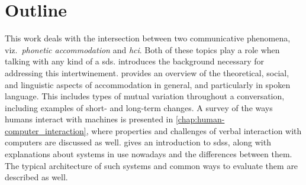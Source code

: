 \section*{Outline}
%
This work deals with the intersection between two communicative phenomena, viz.\ \emph{phonetic accommodation} and \emph{\acl{hci}}.
Both of these topics play a role when talking with any kind of a \acl{sds}.
 introduces the background necessary for addressing this intertwinement.
 provides an overview of the theoretical, social, and linguistic aspects of accommodation in general, and particularly in spoken language.
This includes types of mutual variation throughout a conversation, including examples of short- and long-term changes.
A survey of the ways humans interact with machines is presented in \cref{chap:human-computer_interaction}, where properties and challenges of verbal interaction with computers are discussed as well.
 gives an introduction to \aclp{sds}, along with explanations about systems in use nowadays and the differences between them.
The typical architecture of such systems and common ways to evaluate them are described as well.

